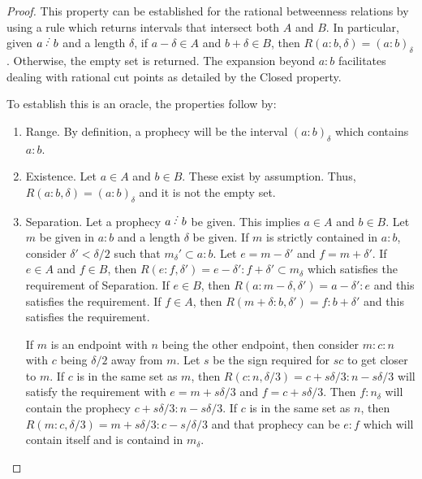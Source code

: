 \documentclass[12pt]{article}
\begin{document}
\begin{proof}
This property can be established for the rational betweenness relations by using a rule which returns intervals that intersect both $A$ and $B$. In particular, given $a \lte b$ and a length $\delta$, if $a-\delta \in A$ and $b+\delta \in B$, then $R(a:b, \delta) = (a:b)_\delta$. Otherwise, the empty set is returned. The expansion beyond $a:b$ facilitates dealing with rational cut points as detailed by the Closed property. 

To establish this is an oracle, the properties follow by: 
\begin{enumerate}
    \item Range. By definition, a prophecy will be the interval $(a:b)_\delta$ which contains $a:b$. 
    \item Existence. Let $a \in A$ and $b \in B$. These exist by assumption. Thus, $R(a:b, \delta)= (a:b)_\delta$  and it is not the empty set.
    \item Separation. Let a prophecy $a \lte b$ be given. This implies $a \in A$ and $b \in B$. Let $m$ be given in $a:b$ and a length $\delta$ be given. If $m$ is strictly contained in $a:b$, consider $\delta' < \delta/2$ such that $m_\delta' \subset a:b$. Let $e = m-\delta'$ and $f=m+\delta'$. If $e \in A$ and $f \in B$, then $R(e:f, \delta') = e-\delta':f+\delta' \subset m_\delta$ which satisfies the requirement of Separation. If $ e\in B$, then $R(a:m-\delta, \delta') = a-\delta' : e$ and this satisfies the requirement. If $f \in A$, then $R(m+\delta:b, \delta') = f:b +\delta'$ and this satisfies the requirement.

    If $m$ is an endpoint with $n$ being the other endpoint, then consider $m:c:n$ with $c$ being $\delta/2$ away from $m$. Let $s$ be the sign required for $sc$ to get closer to $m$. If $c$ is in the same set as $m$, then $R(c:n, \delta/3) = c+s\delta/3 : n-s\delta/3$ will satisfy the requirement with $e=m+s\delta/3$ and $f=c+s\delta/3$. Then $f:n_\delta$ will contain the prophecy $c+s\delta/3 : n-s\delta/3$. If $c$ is in the same set as $n$, then $R(m:c, \delta/3) =  m+s\delta/3:c-s/\delta/3$ and that prophecy can be $e:f$ which will contain itself and is containd in $m_\delta$. 


\end{enumerate}
\end{proof}
\end{document}
